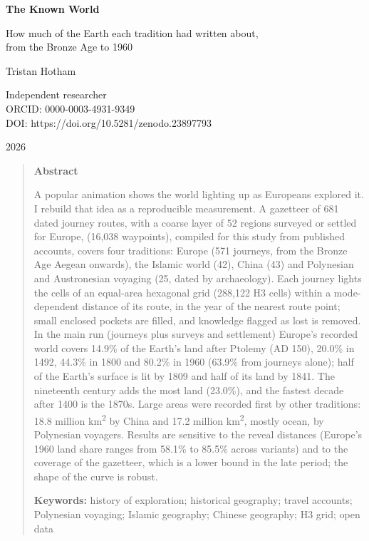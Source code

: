 \documentclass[11pt,a4paper]{article}
\begin{document}
\begin{center}
{\Large\bfseries The Known World\par}
\vspace{0.4em}
{\large How much of the Earth each tradition had written about,\\from the Bronze Age to 1960\par}
\vspace{1.2em}
{\large Tristan Hotham\par}
\vspace{0.3em}
{\small Independent researcher\\
ORCID: 0000-0003-4931-9349\\
DOI: https://doi.org/10.5281/zenodo.23897793\par}
\vspace{0.8em}
2026
\end{center}

\begin{quote}
\small
\begin{center}\textbf{Abstract}\end{center}
A popular animation shows the world lighting up as Europeans explored it. I rebuild that idea as a reproducible measurement. A gazetteer of 681 dated journey routes, with a coarse layer of 52 regions surveyed or settled for Europe, (16,038 waypoints), compiled for this study from published accounts, covers four traditions: Europe (571 journeys, from the Bronze Age Aegean onwards), the Islamic world (42), China (43) and Polynesian and Austronesian voyaging (25, dated by archaeology). Each journey lights the cells of an equal-area hexagonal grid (288,122 H3 cells) within a mode-dependent distance of its route, in the year of the nearest route point; small enclosed pockets are filled, and knowledge flagged as lost is removed. In the main run (journeys plus surveys and settlement) Europe's recorded world covers 14.9\% of the Earth's land after Ptolemy (AD 150), 20.0\% in 1492, 44.3\% in 1800 and 80.2\% in 1960 (63.9\% from journeys alone); half of the Earth's surface is lit by 1809 and half of its land by 1841. The nineteenth century adds the most land (23.0\%), and the fastest decade after 1400 is the 1870s. Large areas were recorded first by other traditions: 18.8 million km\textsuperscript{2} by China and 17.2 million km\textsuperscript{2}, mostly ocean, by Polynesian voyagers. Results are sensitive to the reveal distances (Europe's 1960 land share ranges from 58.1\% to 85.5\% across variants) and to the coverage of the gazetteer, which is a lower bound in the late period; the shape of the curve is robust.

\textbf{Keywords:} history of exploration; historical geography; travel accounts; Polynesian voyaging; Islamic geography; Chinese geography; H3 grid; open data
\end{quote}
\end{document}
